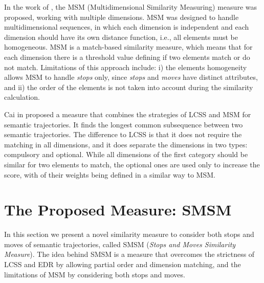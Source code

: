 \documentclass[12pt]{article}
\newtheorem{definition}{Definition}
\begin{document}
In the work of \cite{Furtado:TGIS12156}, the MSM (Multidimensional Similarity Measuring) measure was proposed, working with multiple dimensions. MSM was designed to handle multidimensional sequences, in which each dimension is independent and each dimension should have its own distance function, i.e., all elements must be homogeneous. MSM is a match-based similarity measure, which means that for each dimension there is a threshold value defining if two elements match or do not match. Limitations of this approach include: i) the elements homogeneity allows MSM to handle \textit{stops} only, since \textit{stops} and \textit{moves} have distinct attributes, and ii) the order of the elements is not taken into account during the similarity calculation.

Cai in \cite{CaiLee2016} proposed a measure that combines the strategies of LCSS \cite{vlachos2002discovering} and MSM\cite{Furtado:TGIS12156} for semantic trajectories. It finds the longest common subsequence between two semantic trajectories. The difference to LCSS is that it does not require the matching in all dimensions, and it does separate the dimensions in two types: compulsory and optional. While all dimensions of the first category should be similar for two elements to match, the optional ones are used only to increase the score, with of their weights being defined in a similar way to MSM.


\section{The Proposed Measure: SMSM} \label{sec:proposed_measure}
In this section we present a novel similarity measure to consider both stops and moves of semantic trajectories, called SMSM (\textit{Stops and Moves Similarity Measure}). The idea behind SMSM is a measure that overcomes the strictness of LCSS and EDR by allowing partial order and dimension matching, and the limitations of MSM by considering both stops and moves.


\end{document}
